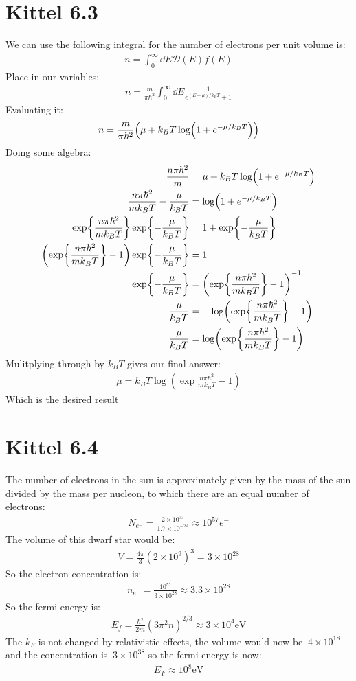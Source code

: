 \documentclass[12pt]{article}
\newcommand{\D}{\mathcal{D}}
\begin{document}
\section*{Kittel 6.3}
We can use the following integral for the number of electrons per unit volume is:
\begin{align*}
  n=\int_0^\infty\dd{E}\D(E)f(E)
\end{align*}
Place in our variables:
\begin{align*}
  n=\frac{m}{\pi\hbar^2}\int_0^\infty\dd{E}\frac{1}{e^{(E-\mu)/k_BT}+1}
\end{align*}
Evaluating it:
\begin{align*}
  n=\frac{m}{\pi\hbar^2}\qty(\mu+k_BT\log(1+e^{-\mu/k_BT}))
\end{align*}
Doing some algebra:
\begin{align*}
  \frac{n\pi\hbar^2}{m}&=\mu+k_BT\log(1+e^{-\mu/k_BT})\\
  \frac{n\pi\hbar^2}{mk_BT}-\frac{\mu}{k_BT}&=\log(1+e^{-\mu/k_BT})\\
  \exp{\frac{n\pi\hbar^2}{mk_BT}}\exp{-\frac{\mu}{k_BT}}
  &=1+\exp{-\frac{\mu}{k_BT}}\\
  \qty(\exp{\frac{n\pi\hbar^2}{mk_BT}}-1)\exp{-\frac{\mu}{k_BT}}&=1\\
  \exp{-\frac{\mu}{k_BT}}&=\qty(\exp{\frac{n\pi\hbar^2}{mk_BT}}-1)^{-1}\\
  -\frac{\mu}{k_BT}&=-\log(\exp{\frac{n\pi\hbar^2}{mk_BT}}-1)\\
  \frac{\mu}{k_BT}&=\log(\exp{\frac{n\pi\hbar^2}{mk_BT}}-1)
\end{align*}
Mulitplying through by $k_BT$ gives our final answer:
\begin{align*}
  \boxed{\mu=k_BT\log(\exp{\frac{n\pi\hbar^2}{mk_BT}}-1)}
\end{align*}
Which is the desired result
\section*{Kittel 6.4}
The number of electrons in the sun is approximately given by the mass of the sun divided by the mass per nucleon, to which there are an equal number of electrons:
\begin{align*}
  N_{e^-}=\frac{2\times10^{33}}{1.7\times10^{-24}}\approx10^{57}e^{-}
\end{align*}
The volume of this dwarf star would be:
\begin{align*}
  V=\frac{4\pi}{3}(2\times 10^9)^3=3\times10^{28}
\end{align*}
So the electron concentration is:
\begin{align*}
  n_{e^-}=\frac{10^{57}}{3\times10^{28}}\approx3.3\times10^{28}
\end{align*}
So the fermi energy is:
\begin{align*}
  E_f=\frac{\hbar^2}{2m}(3\pi^2n)^{2/3}\approx3\times10^4\text{eV}
\end{align*}
The $k_F$ is not changed by relativistic effects, the volume would now be $~4\times10^{18}$ and the concentration is $~3\times10^{38}$ so the fermi energy is now:
\begin{align*}
  E_F\approx10^8\text{eV}
\end{align*}
\end{document}
